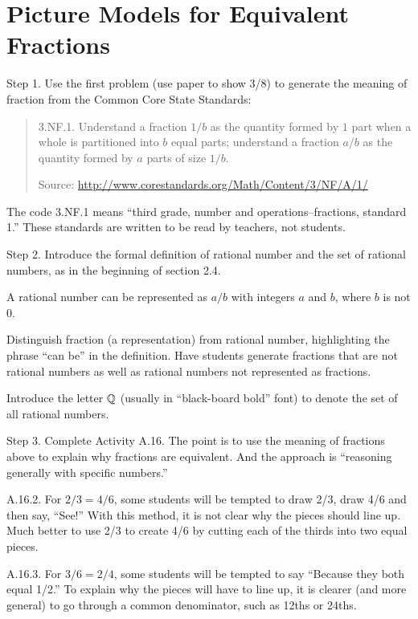 \newpage
\section{Picture Models for Equivalent Fractions}\label{A:EF}

\begin{teachingnote}

Step 1.  Use the first problem (use paper to show 3/8) to generate the meaning of fraction from the Common Core State Standards:  

\begin{quote}
3.NF.1. Understand a fraction $1/b$ as the quantity formed by $1$ part when a
whole is partitioned into $b$ equal parts; understand a fraction $a/b$ as
the quantity formed by $a$ parts of size $1/b$.

Source:  \url{http://www.corestandards.org/Math/Content/3/NF/A/1/}
\end{quote}


The code 3.NF.1 means ``third grade, number and operations--fractions, standard 1.''  These standards are written to be read by teachers, not students.

Step 2.  Introduce the formal definition of rational number and the set of rational numbers, as in the beginning of section 2.4.  

A rational number can be represented as $a/b$ with integers $a$ and $b$, where $b$ is not $0$.  

Distinguish fraction (a representation) from rational number, highlighting the phrase ``can be'' in the definition.  Have students generate fractions that are not rational numbers as well as rational numbers not represented as fractions.  

Introduce the letter $\mathbb Q$ (usually in ``black-board bold'' font) to denote the set of all rational numbers. 

Step 3.  Complete Activity A.16.  The point is to use the meaning of fractions above to explain why fractions are equivalent.  And the approach is ``reasoning generally with specific numbers.'' 

A.16.2.  For $2/3 = 4/6$, some students will be tempted to draw 2/3, draw 4/6 and then say, ``See!''  With this method, it is not clear why the pieces should line up.  Much better to use 2/3 to create 4/6 by cutting each of the thirds into two equal pieces.  

A.16.3.  For $3/6 = 2/4$, some students will be tempted to say ``Because they both equal 1/2.''  To explain why the pieces will have to line up, it is clearer (and more general) to go through a common denominator, such as 12ths or 24ths.  
 

\end{teachingnote}
